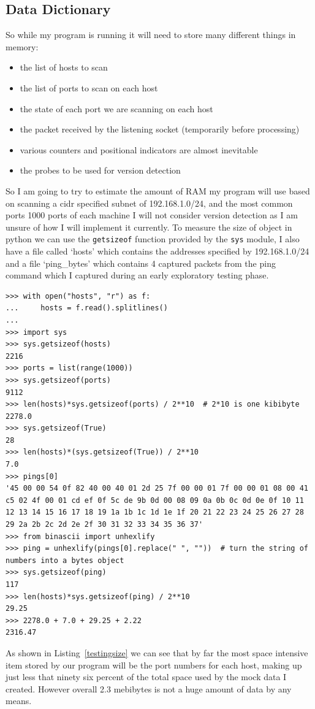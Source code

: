 \documentclass[titlepage]{article}
\let\Oldsubsection\subsection{}
\renewcommand{\subsection}{\FloatBarrier\Oldsubsection}
\begin{document}
\subsection{Data Dictionary}

So while my program is running it will need to store many different things in memory:
\begin{itemize}
  \item{the list of hosts to scan}
  \item{the list of ports to scan on each host}
  \item{the state of each port we are scanning on each host}
  \item{the packet received by the listening socket (temporarily before processing)}
  \item{various counters and positional indicators are almost inevitable}
  \item{the probes to be used for version detection}
\end{itemize}
So I am going to try to estimate the amount of RAM my program will use based on scanning a 
\gls{cidr} specified subnet of 192.168.1.0/24, and the most common ports 1000 ports of each machine
I will not consider version detection as I am unsure of how I will implement it currently.
To measure the size of object in python we can use the \verb|getsizeof| function provided by the
\verb|sys| module, I also have a file called `hosts' which contains the addresses specified by
192.168.1.0/24 and a file `ping\_bytes' which contains 4 captured packets from the ping command
which I captured during an early exploratory testing phase.
\lstset{language=python}
\begin{lstlisting}[label=testingsize,caption=some testing I did on the size of python objects]
>>> with open("hosts", "r") as f:
...     hosts = f.read().splitlines()
... 
>>> import sys
>>> sys.getsizeof(hosts)
2216
>>> ports = list(range(1000))
>>> sys.getsizeof(ports)
9112
>>> len(hosts)*sys.getsizeof(ports) / 2**10  # 2*10 is one kibibyte
2278.0
>>> sys.getsizeof(True)
28
>>> len(hosts)*(sys.getsizeof(True)) / 2**10
7.0
>>> pings[0]
'45 00 00 54 0f 82 40 00 40 01 2d 25 7f 00 00 01 7f 00 00 01 08 00 41 c5 02 4f 00 01 cd ef 0f 5c de 9b 0d 00 08 09 0a 0b 0c 0d 0e 0f 10 11 12 13 14 15 16 17 18 19 1a 1b 1c 1d 1e 1f 20 21 22 23 24 25 26 27 28 29 2a 2b 2c 2d 2e 2f 30 31 32 33 34 35 36 37'
>>> from binascii import unhexlify
>>> ping = unhexlify(pings[0].replace(" ", ""))  # turn the string of numbers into a bytes object
>>> sys.getsizeof(ping)
117
>>> len(hosts)*sys.getsizeof(ping) / 2**10
29.25
>>> 2278.0 + 7.0 + 29.25 + 2.22
2316.47
\end{lstlisting}
As shown in Listing~\ref{testingsize} we can see that by far the most space intensive item stored
by our program will be the port numbers for each host, making up just less that ninety six percent
of the total space used by the mock data I created. However overall 2.3 mebibytes is not a huge
amount of data by any means.
\end{document}
